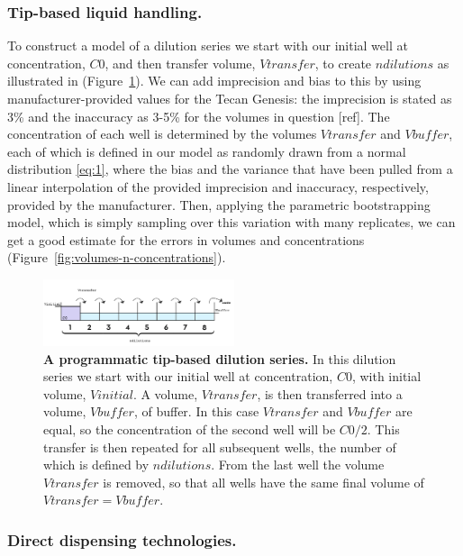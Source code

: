 \documentclass[aps,pre,twocolumn,nofootinbib,superscriptaddress,linenumbers]{revtex4-1}
\begin{document}
\subsubsection*{Tip-based liquid handling.}

To construct a model of a dilution series we start with our initial well at concentration, $C0$, and then transfer volume, $Vtransfer$, to create $ndilutions$ as illustrated in (Figure~\ref{fig:dilution}). 
We can add imprecision and bias to this by using manufacturer-provided values for the Tecan Genesis: the imprecision is stated as 3\% and the inaccuracy as 3-5\% for the volumes in question [ref]. 
The concentration of each well is determined by the volumes $Vtransfer$ and $Vbuffer$, each of which is defined in our model as randomly drawn from a normal distribution \ref{eq:1}, where the bias and the variance that have been pulled from a linear interpolation of the provided imprecision and inaccuracy, respectively, provided by the manufacturer.
Then, applying the parametric bootstrapping model, which is simply sampling over this variation with many replicates, we can get a good estimate for the errors in volumes and concentrations (Figure~\ref{fig:volumes-n-concentrations}).

\begin{figure}[tb]
    \includegraphics[width=0.5\textwidth]{../figures/dilution.pdf}

  \caption{{\bf A programmatic tip-based dilution series.}
  In this dilution series we start with our initial well at concentration, $C0$, with initial volume, $Vinitial$. A volume, $Vtransfer$, is then transferred into a volume, $Vbuffer$, of buffer. 
  In this case $Vtransfer$ and $Vbuffer$ are equal, so the concentration of the second well will be $C0/2$. This transfer is then repeated for all subsequent wells, the number of which is defined by $ndilutions$. 
  From the last well the volume $Vtransfer$ is removed, so that all wells have the same final volume of $Vtransfer=Vbuffer$.
  }
  \label{fig:dilution}
\end{figure}

\subsubsection*{Direct dispensing technologies.}
\end{document}
